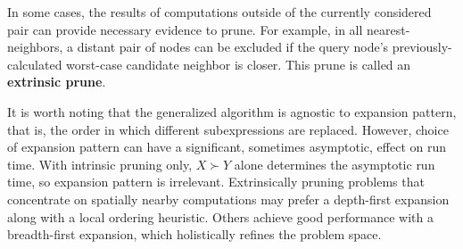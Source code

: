 \documentclass[twoside,leqno,twocolumn]{article}
\newcommand{\prefsplit}[2]{#1 \succ #2}
\newcommand{\summary}{\delta}
\newcommand{\gnp}{\psi}
\newcommand{\defterm}[1]{{\bf #1}}
\newcommand{\kdroot}[1]{#1^{\text{root}}}
\newcommand{\outstat}{\sigma}
\begin{document}
In some cases, the results of computations outside of the currently considered pair can provide necessary evidence to prune.
For example, in all nearest-neighbors, a distant pair of nodes can be excluded if the query node's previously-calculated worst-case candidate neighbor is closer.
This prune is called an \defterm{extrinsic prune}.



It is worth noting that the generalized algorithm is agnostic to expansion pattern, that is, the order in which different subexpressions are replaced.
However, choice of expansion pattern can have a significant, sometimes asymptotic, effect on run time.
With intrinsic pruning only, $\prefsplit{X}{Y}$ alone determines the asymptotic run time, so expansion pattern is irrelevant.
Extrinsically pruning problems that concentrate on spatially nearby computations may prefer a depth-first expansion along with a local ordering heuristic.
Others achieve good performance with a breadth-first expansion, which holistically refines the problem space.
\end{document}
